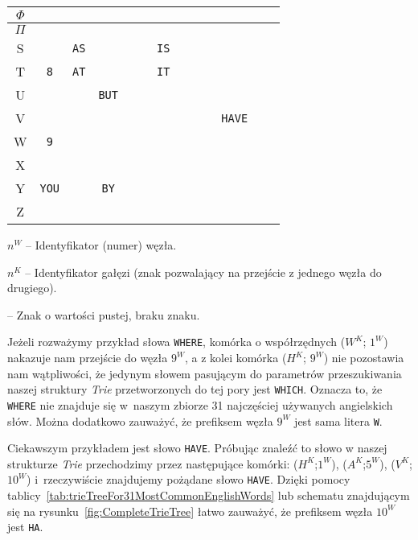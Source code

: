 \begin{table}
\begin{threeparttable}
{\begin{tabularx}{\textwidth}{C{1}||C{1}|C{1}|C{1}|C{1}|C{1}|C{1}|C{1}|C{1}|C{1}|C{1}|C{1}|C{1}|}
					\hline
					$\Phi$ &&&&&&&&&&&& \\
					\hline
					$\Pi$ &&&&&&&&&&&& \\
					\hline
					S && \texttt{AS} &&&& \texttt{IS} &&&&&& \\
					\hline
					T & \texttt{8} & \texttt{AT} &&&& \texttt{IT} &&&&&& \\
					\hline
					U &&& \texttt{BUT} &&&&&&&&& \\
					\hline
					V &&&&&&&&&& \texttt{HAVE} && \\
					\hline
					W & \texttt{9} &&&&&&&&&&& \\
					\hline
					X &&&&&&&&&&&& \\
					\hline
					Y & \texttt{YOU} && \texttt{BY} &&&&&&&&& \\
					\hline
					Z &&&&&&&&&&&& \\
					\hline
				\end{tabularx}
			}
			
			\begin{tablenotes}
				\centering
				\footnotesize
				\item $n^W$ -- Identyfikator (numer) węzła.
				\item $n^K$ -- Identyfikator gałęzi (znak pozwalający na przejście z jednego węzła do drugiego).
				\item\textunderscore{} -- Znak o wartości pustej, braku znaku.
			\end{tablenotes}
			
		\end{threeparttable}
	\end{table}
	
	Jeżeli rozważymy przykład słowa \texttt{WHERE}, komórka o współrzędnych ($W^K$; $1^W$) nakazuje nam przejście do węzła $9^W$, a z kolei komórka ($H^K$; $9^W$) nie pozostawia nam wątpliwości, że jedynym słowem pasującym do parametrów przeszukiwania naszej struktury \emph{Trie}  przetworzonych do tej pory jest \texttt{WHICH}. Oznacza to, że \texttt{WHERE} nie znajduje się w~naszym zbiorze 31 najczęściej używanych angielskich słów. Można dodatkowo zauważyć, że prefiksem węzła $9^W$ jest sama litera \texttt{W}.
	
    Ciekawszym przykładem jest słowo \texttt{HAVE}. Próbując znaleźć to słowo w naszej strukturze \emph{Trie} przechodzimy przez następujące komórki: ($H^K$;$1^W$), ($A^K$;$5^W$), ($V^K$;$10^W$) i~rzeczywiście znajdujemy pożądane słowo \texttt{HAVE}. Dzięki pomocy tablicy~\ref{tab:trieTreeFor31MostCommonEnglishWords} lub schematu znajdującym się na rysunku~\ref{fig:CompleteTrieTree} łatwo zauważyć, że prefiksem węzła $10^W$ jest \texttt{HA}.
	
